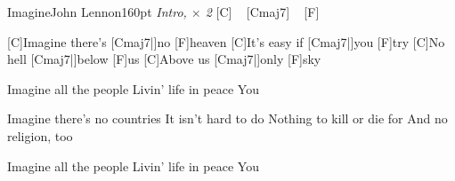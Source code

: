 \begin{song}{Imagine}{John Lennon}{160pt}
\emph{Intro, $\times$ 2}
[C] ~ [Cmaj7] ~ [F] ~

%
[C]Imagine there's [Cmaj7|]{no} [F]heaven
[C]It's easy if [Cmaj7|]{you} [F]try
[C]No hell [Cmaj7|]{below} [F]us
[C]Above us [Cmaj7|]{only} [F]sky

\chorus%
Imagine all the people
Livin' life in peace
You

%
Imagine there's no countries
It isn't hard to do
Nothing to kill or die for
And no religion, too

\chorus%
Imagine all the people
Livin' life in peace
You
\end{song}
